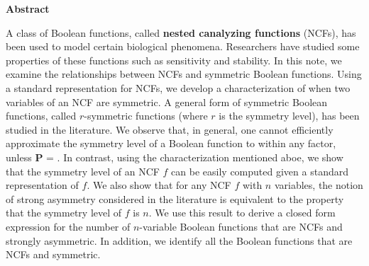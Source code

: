 \vspace*{-0.05in}
\begin{center}
\textbf{Abstract}  %
\end{center}

\smallskip

A class of Boolean functions, 
called \textbf{nested canalyzing functions} (NCFs),
has been used to model certain biological phenomena.
Researchers have studied some properties of these functions
such as sensitivity and stability.
In this note, we examine the relationships between NCFs and symmetric 
Boolean functions. 
Using a standard representation for NCFs, we develop a 
characterization of when two variables of an NCF are symmetric.
A general form of symmetric Boolean functions,
called $r$-symmetric functions (where $r$ is the symmetry level),
has been studied in the literature.
We observe that, in general,
one cannot efficiently approximate the symmetry level of
a Boolean function to within any factor, unless \textbf{P} = \cnp. 
In contrast, using the characterization mentioned aboe, we show 
that the symmetry level of an NCF $f$
can be easily computed given a standard representation of $f$.
We also show that for any NCF $f$ with $n$ variables, the notion of
strong asymmetry considered in the literature is equivalent to
the property that the symmetry level of $f$ is $n$.
We use this result to derive a closed form expression for the
number of $n$-variable Boolean functions that are NCFs and strongly
asymmetric.
In addition, we identify all the Boolean functions that are NCFs 
and symmetric. 
